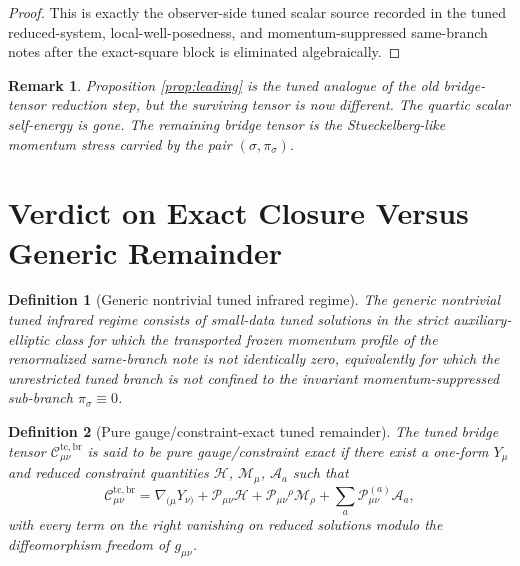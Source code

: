 \documentclass[11pt]{article}
\newtheorem{definition}{Definition}
\newtheorem{remark}{Remark}
\begin{document}
\begin{proof}
This is exactly the observer-side tuned scalar source recorded in the tuned reduced-system, local-well-posedness, and momentum-suppressed same-branch notes after the exact-square block is eliminated algebraically.
\end{proof}

\begin{remark}
Proposition \ref{prop:leading} is the tuned analogue of the old bridge-tensor reduction step, but the surviving tensor is now different. The quartic scalar self-energy is gone. The remaining bridge tensor is the Stueckelberg-like momentum stress carried by the pair \((\sigma,\pi_\sigma)\).
\end{remark}

\section{Verdict on Exact Closure Versus Generic Remainder}

\begin{definition}[Generic nontrivial tuned infrared regime]
\label{def:generic}
The \emph{generic nontrivial tuned infrared regime} consists of small-data tuned solutions in the strict auxiliary-elliptic class for which the transported frozen momentum profile of the renormalized same-branch note is not identically zero, equivalently for which the unrestricted tuned branch is not confined to the invariant momentum-suppressed sub-branch \(\pi_\sigma\equiv 0\).
\end{definition}

\begin{definition}[Pure gauge/constraint-exact tuned remainder]
\label{def:pure}
The tuned bridge tensor \(\mathcal C_{\mu\nu}^{\mathrm{tc,br}}\) is said to be \emph{pure gauge/constraint exact} if there exist a one-form \(Y_\mu\) and reduced constraint quantities \(\mathcal H\), \(\mathcal M_\mu\), \(\mathcal A_a\) such that
\begin{equation}
\mathcal C_{\mu\nu}^{\mathrm{tc,br}}
=
\nabla_{(\mu}Y_{\nu)}
+\mathcal P_{\mu\nu}\mathcal H
+\mathcal P_{\mu\nu}{}^\rho\mathcal M_\rho
+\sum_a \mathcal P_{\mu\nu}^{(a)}\mathcal A_a,
\label{eq:pure}
\end{equation}
with every term on the right vanishing on reduced solutions modulo the diffeomorphism freedom of \(g_{\mu\nu}\).
\end{definition}
\end{document}
